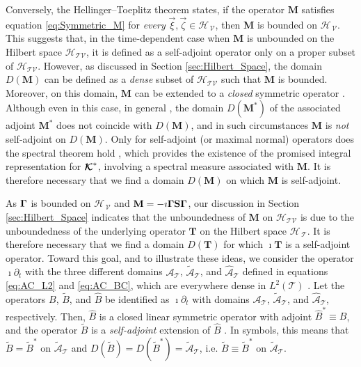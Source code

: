 \documentclass[11pt]{amsart}
\newcommand{\Mb}{\mathbf{M}}
\newcommand{\Tb}{\mathbf{T}}
\newcommand{\Sb}{\mathbf{S}}
\newcommand\Kbc{\mbox{\boldmath${\mathcal{K}}$}}
\newcommand{\Tc}{\mathcal{T}}
\newcommand{\Vc}{\mathcal{V}}
\newcommand{\Hs}{\mathscr{H}}
\newcommand{\As}{\mathscr{A}}
\newcommand\bGamma{\mbox{\boldmath${\Gamma}$}}
\begin{document}
Conversely, the Hellinger--Toeplitz theorem \cite{Reed-1980} states,
if the operator $\Mb$ satisfies equation \eqref{eq:Symmetric_M} for
\emph{every} $\vec{\xi},\vec{\zeta}\in\Hs_{\,\Vc}$, then $\Mb$ is
bounded on $\Hs_{\,\Vc}$. This suggests that, in the time-dependent
case when $\Mb$ is unbounded on the Hilbert space $\Hs_{\Tc\Vc}$, it
is defined as a self-adjoint operator only on a proper subset of
$\Hs_{\Tc\Vc}$. However, as discussed in 
Section \ref{sec:Hilbert_Space}, the domain $D(\Mb)$ can be defined as
a \emph{dense} subset of $\Hs_{\Tc\Vc}$ such that $\Mb$ is
bounded. Moreover, on this domain, $\Mb$ can be extended to a 
\emph{closed} symmetric operator \cite{Reed-1980,Stone:64}. Although
even in this case, in general \cite{Reed-1980}, the domain $D(\Mb^*)$
of the associated adjoint $\Mb^*$ does not coincide with $D(\Mb)$, and
in such circumstances $\Mb$ is \emph{not} self-adjoint on $D(\Mb)$. Only for
self-adjoint (or maximal normal) operators does the spectral theorem hold
\cite{Reed-1980}, which provides the existence of the promised
integral representation for $\Kbc^*$, involving a spectral measure
associated with $\Mb$. It is therefore necessary that we find a
domain $D(\Mb)$ on which $\Mb$ is self-adjoint.




As $\bGamma$ is bounded on $\Hs_{\,\Vc}$ and
$\Mb=-\imath\bGamma\Sb\bGamma$, our discussion in Section
\ref{sec:Hilbert_Space} indicates that the unboundedness of $\Mb$ on
$\Hs_{\Tc\Vc}$ is due to the unboundedness of the underlying operator
$\Tb$ on the Hilbert space $\Hs_{\,\Tc}$. It is therefore necessary
that we find a domain $D(\Tb)$ for which $\imath\Tb$ is a self-adjoint
operator. Toward this goal, and to illustrate these ideas, we consider
the operator $\imath\partial_t$ with the three different domains $\As_{\Tc}$,
$\tilde{\As}_{\Tc}$, and $\hat{\As}_{\Tc}$ defined in equations
\eqref{eq:AC_L2} and \eqref{eq:AC_BC}, which are everywhere dense in
$L^2(\Tc)$ \cite{Stone:64}. Let the operators $B$, $\tilde{B}$, and
$\hat{B}$ be identified as $\imath\partial_t$ with domains $\As_{\Tc}$,
$\tilde{\As}_{\Tc}$, and $\hat{\As}_{\Tc}$, respectively. Then,
$\hat{B}$ is a closed linear symmetric operator with adjoint
$\hat{B}^*\equiv B$, and the operator $\tilde{B}$ is a \emph{self-adjoint}
extension of $\hat{B}$ \cite{Stone:64}. In symbols, this means that 
$\tilde{B}=\tilde{B}^*$ on $\tilde{\As}_{\Tc}$ and
$D(\tilde{B})=D(\tilde{B}^*)=\tilde{\As}_{\Tc}$,
i.e. $\tilde{B}\equiv\tilde{B}^*$ on $\tilde{\As}_{\Tc}$.     
\end{document}
